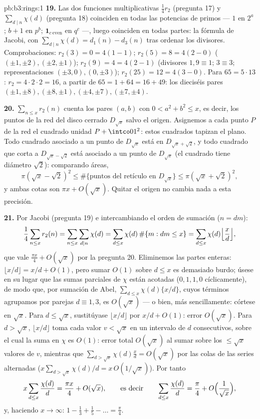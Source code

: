 \begin{solution}{pb:b3:rings:1}
\textbf{19.} Las dos funciones multiplicativas $\frac14r_2$ (pregunta
17) y $\sum_{d\mid n}\chi(d)$ (pregunta 18) coinciden en todas las
potencias de primos --- $1$ en $2^a$; $b + 1$ en $p^b$;
$\mathbf 1_{c\ \mathrm{even}}$ en $q^c$ ---, luego coinciden en todas
partes: la fórmula de Jacobi, con $\sum_{d\mid
n}\chi(d) = d_1(n) - d_3(n)$ tras ordenar los divisores. Comprobaciones:
$r_2(3) = 0 = 4(1 - 1)$; $r_2(5) = 8 = 4(2 - 0)$
($(\pm1,\pm2), (\pm2,\pm1)$); $r_2(9) = 4 = 4(2 - 1)$
(divisores $1, 9 \equiv 1$; $3 \equiv 3$; representaciones
$(\pm3, 0), (0, \pm3)$); $r_2(25) = 12 = 4(3 - 0)$. Para $65 =
5\cdot13$: $r_2 = 4\cdot2\cdot2 = 16$, a partir de $65 = 1 + 64 = 16
+ 49$: los dieciséis pares $(\pm1, \pm8), (\pm8, \pm1), (\pm4,
\pm7), (\pm7, \pm4)$.

\textbf{20.} $\sum_{n \leq x}r_2(n)$ cuenta los pares $(a, b)$ con
$0 < a^2 + b^2 \leq x$, es decir, los puntos de la red del disco cerrado
$D_{\sqrt x}$ salvo el origen. Asignemos a cada punto $P$ de la red el
cuadrado unidad $P + \intco01^2$: estos cuadrados tapizan el plano. Todo
cuadrado asociado a un punto de $D_{\sqrt x}$ está  en
$D_{\sqrt x + \sqrt2}$, y todo cuadrado que corta a
$D_{\sqrt x - \sqrt 2}$ está asociado a un punto de $D_{\sqrt x}$ (el
cuadrado tiene diámetro $\sqrt 2$): comparando áreas,
\[
\pi(\sqrt x - \sqrt2)^2 \leq \#\{\text{puntos del retículo en }
D_{\sqrt x}\} \leq \pi(\sqrt x + \sqrt 2)^2,
\]
y ambas cotas son $\pi x + O(\sqrt x)$. Quitar el origen no cambia nada
a esta precisión.

\textbf{21.} Por Jacobi (pregunta 19) e intercambiando el orden de
sumación ($n = dm$):
\[
\frac14\sum_{n\leq x}r_2(n) = \sum_{n \leq x}\sum_{d \mid
n}\chi(d) = \sum_{d \leq x}\chi(d)\,\#\{m : dm \leq x\}
= \sum_{d\leq x}\chi(d)\Bigl\lfloor\frac xd\Bigr\rfloor,
\]
que vale $\frac{\pi x}4 + O(\sqrt x)$ por la pregunta 20. Eliminemos las
partes enteras: $\lfloor x/d\rfloor = x/d + O(1)$, pero sumar $O(1)$
sobre $d \leq x$ es demasiado burdo; úsese en su lugar que las sumas
parciales de $\chi$ están acotadas ($0, 1, 1, 0$ cíclicamente), de modo
que, por sumación de Abel, $\sum_{d\leq x}\chi(d)\{x/d\}$, cuyos
términos agrupamos por parejas $d \equiv 1, 3$, es $O(\sqrt x)$ --- o
bien, más sencillamente: córtese en $\sqrt x$. Para $d \leq
\sqrt x$, sustitúyase $\lfloor x/d\rfloor$ por $x/d + O(1)$: error
$O(\sqrt x)$. Para $d > \sqrt x$, $\lfloor x/d\rfloor$ toma cada valor
$v < \sqrt x$ en un intervalo de $d$ consecutivos, sobre el cual la suma
en $\chi$ es $O(1)$: error total $O(\sqrt x)$ al sumar sobre los
$\leq \sqrt x$ valores de $v$, mientras que
$\sum_{d > \sqrt x}\chi(d)\frac xd = O(\sqrt x)$ por las colas de las
series alternadas ($x\sum_{d>\sqrt x}\chi(d)/d =
x\,O(1/\sqrt x)$). Por tanto
\[
x\sum_{d \leq x}\frac{\chi(d)}d = \frac{\pi x}4 + O(\sqrt x),
\qquad\text{es decir}\qquad
\sum_{d\leq x}\frac{\chi(d)}d = \frac\pi4 +
O\Bigl(\frac1{\sqrt x}\Bigr),
\]
y, haciendo $x \to \infty$: $1 - \frac13 + \frac15 - \dots =
\frac\pi4$.


\end{solution}
